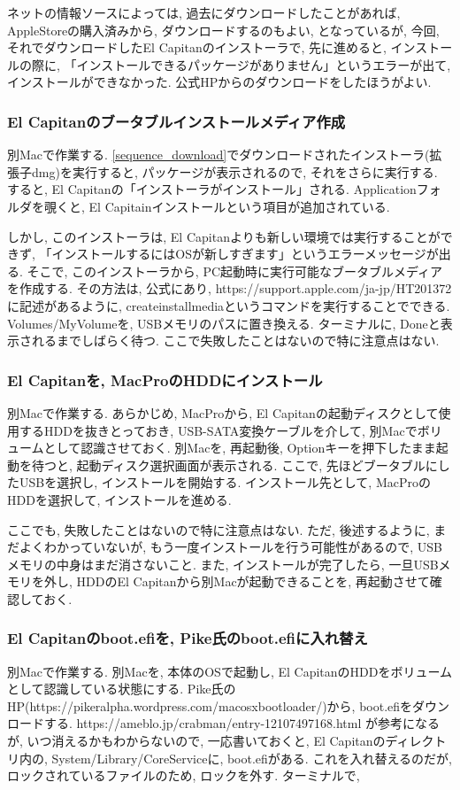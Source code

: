 \documentclass{jsarticle}
\begin{document}
ネットの情報ソースによっては, 過去にダウンロードしたことがあれば, AppleStoreの購入済みから, ダウンロードするのもよい, となっているが, 
今回, それでダウンロードしたEl Capitanのインストーラで, 先に進めると, インストールの際に, 「インストールできるパッケージがありません」というエラーが出て, インストールができなかった. 公式HPからのダウンロードをしたほうがよい. 

\subsubsection{El Capitanのブータブルインストールメディア作成}
別Macで作業する. 
\ref{sequence_download}でダウンロードされたインストーラ(拡張子dmg)を実行すると, パッケージが表示されるので, それをさらに実行する. 
すると, El Capitanの「インストーラがインストール」される. Applicationフォルダを覗くと, El Capitainインストールという項目が追加されている. 

しかし, このインストーラは, El Capitanよりも新しい環境では実行することができず, 「インストールするにはOSが新しすぎます」というエラーメッセージが出る. 
そこで, このインストーラから, PC起動時に実行可能なブータブルメディアを作成する. その方法は, 公式にあり, 
https://support.apple.com/ja-jp/HT201372
に記述があるように, createinstallmediaというコマンドを実行することでできる.
Volumes/MyVolumeを, USBメモリのパスに置き換える. 
ターミナルに, Doneと表示されるまでしばらく待つ. 
ここで失敗したことはないので特に注意点はない. 

\subsubsection{El Capitanを, MacProのHDDにインストール}
別Macで作業する. 
あらかじめ, MacProから, El Capitanの起動ディスクとして使用するHDDを抜きとっておき, USB-SATA変換ケーブルを介して, 別Macでボリュームとして認識させておく. 
別Macを, 再起動後, Optionキーを押下したまま起動を待つと, 起動ディスク選択画面が表示される. 
ここで, 先ほどブータブルにしたUSBを選択し, インストールを開始する. インストール先として, MacProのHDDを選択して, インストールを進める. 

ここでも, 失敗したことはないので特に注意点はない. ただ, 後述するように, まだよくわかっていないが, もう一度インストールを行う可能性があるので, USBメモリの中身はまだ消さないこと. 
また, インストールが完了したら, 一旦USBメモリを外し, HDDのEl Capitanから別Macが起動できることを, 再起動させて確認しておく. 

\subsubsection{El Capitanのboot.efiを, Pike氏のboot.efiに入れ替え}
別Macで作業する. 
別Macを, 本体のOSで起動し, El CapitanのHDDをボリュームとして認識している状態にする. 
Pike氏のHP(https://pikeralpha.wordpress.com/macosxbootloader/)から, boot.efiをダウンロードする. 
https://ameblo.jp/crabman/entry-12107497168.html が参考になるが, いつ消えるかもわからないので, 一応書いておくと, 
El Capitanのディレクトリ内の, 
System/Library/CoreServiceに, boot.efiがある. 
これを入れ替えるのだが, ロックされているファイルのため, ロックを外す. 
ターミナルで, 
\end{document}
